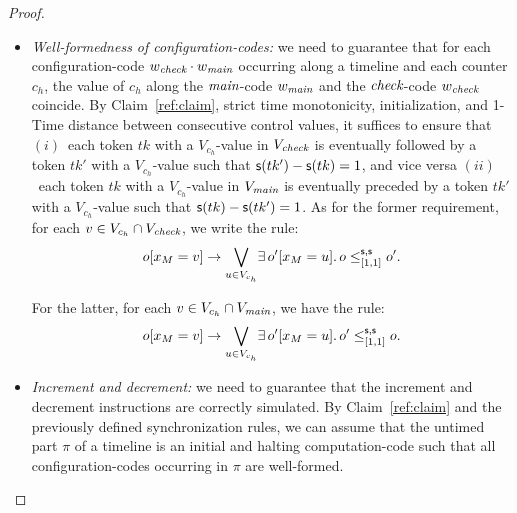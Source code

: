 \begin{proof}
\begin{itemize}
   \item \emph{Well-formedness of configuration-codes:} we need to guarantee that for each configuration-code $w_{\textit{check}}\cdot w_{\textit{main}}$ occurring along a timeline and 
    each counter $c_h$, the value of $c_h$ along the ${\textit{main}}$-code $w_{\textit{main}}$ and the ${\textit{check}}$-code $w_{\textit{check}}$ coincide.
    By Claim~\ref{ref:claim}, strict time monotonicity, initialization, and 1-Time distance between consecutive control values,  it suffices to ensure that $(i)$~each token $tk$  with
    a $V_{c_h}$-value in $V_{\textit{check}}$ is eventually followed by a token $tk'$ with a $V_{c_h}$-value such that  $\mathsf{s}(tk')-\mathsf{s}(tk)=1$, and vice versa $(ii)$~each token $tk$  with
    a $V_{c_h}$-value in $V_{\textit{main}}$ is eventually preceded by a token $tk'$ with a $V_{c_h}$-value such that  $\mathsf{s}(tk)-\mathsf{s}(tk')=1$. As for the former requirement, for each   $v\in V_{c_h}\cap V_{\textit{check}}$, we write the rule:
   \[
   o[x_M=v] \rightarrow \displaystyle{\bigvee_{u\in V_{c_h}}} \exists\, o'[x_M= u].\, o\leq^{\mathsf{s},\mathsf{s}}_{[1,1]} o'.
   \]
   
   For the latter, for each   $v\in V_{c_h}\cap V_{\textit{main}}$, we have the rule:
   \[
   o[x_M=v] \rightarrow \displaystyle{\bigvee_{u\in V_{c_h}}} \exists\, o'[x_M= u].\, o'\leq^{\mathsf{s},\mathsf{s}}_{[1,1]} o.
   \]
   
   \item \emph{Increment and decrement:} we need to guarantee that the increment and decrement instructions are correctly simulated.
    By Claim~\ref{ref:claim} and the previously defined synchronization rules, we can assume that the untimed part $\pi$ of a timeline is an initial and halting
    computation-code such that all  configuration-codes occurring in $\pi$ are well-formed.


\end{itemize}
\end{proof}
